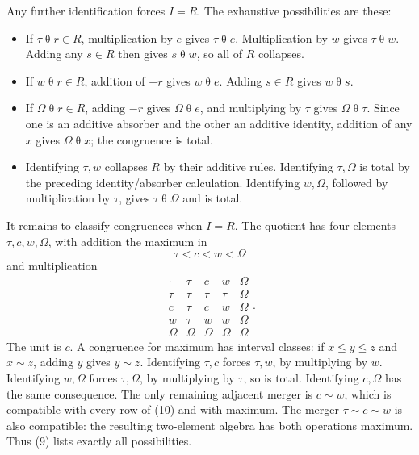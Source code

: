 \documentclass[
]{article}
\providecommand{\tightlist}{%
  \setlength{\itemsep}{0pt}\setlength{\parskip}{0pt}}
\begin{document}
Any further identification forces \(I=R\). The exhaustive possibilities
are these:

\begin{itemize}
\tightlist
\item
  If \(\tau\mathrel\theta r\in R\), multiplication by \(e\) gives
  \(\tau\mathrel\theta e\). Multiplication by \(w\) gives
  \(\tau\mathrel\theta w\). Adding any \(s\in R\) then gives
  \(s\mathrel\theta w\), so all of \(R\) collapses.
\item
  If \(w\mathrel\theta r\in R\), addition of \(-r\) gives
  \(w\mathrel\theta e\). Adding \(s\in R\) gives \(w\mathrel\theta s\).
\item
  If \(\Omega\mathrel\theta r\in R\), adding \(-r\) gives
  \(\Omega\mathrel\theta e\), and multiplying by \(\tau\) gives
  \(\Omega\mathrel\theta\tau\). Since one is an additive absorber and
  the other an additive identity, addition of any \(x\) gives
  \(\Omega\mathrel\theta x\); the congruence is total.
\item
  Identifying \(\tau,w\) collapses \(R\) by their additive rules.
  Identifying \(\tau,\Omega\) is total by the preceding
  identity/absorber calculation. Identifying \(w,\Omega\), followed by
  multiplication by \(\tau\), gives \(\tau\mathrel\theta\Omega\) and is
  total.
\end{itemize}

It remains to classify congruences when \(I=R\). The quotient has four
elements \(\tau,c,w,\Omega\), with addition the maximum in \[
\tau<c<w<\Omega
\] and multiplication \[
\begin{array}{c|cccc}
\cdot&\tau&c&w&\Omega\\\hline
\tau&\tau&\tau&\tau&\Omega\\
c&\tau&c&w&\Omega\\
w&\tau&w&w&\Omega\\
\Omega&\Omega&\Omega&\Omega&\Omega
\end{array}.
\tag{10}
\] The unit is \(c\). A congruence for maximum has interval classes: if
\(x\le y\le z\) and \(x\sim z\), adding \(y\) gives \(y\sim z\).
Identifying \(\tau,c\) forces \(\tau,w\), by multiplying by \(w\).
Identifying \(w,\Omega\) forces \(\tau,\Omega\), by multiplying by
\(\tau\), so is total. Identifying \(c,\Omega\) has the same
consequence. The only remaining adjacent merger is \(c\sim w\), which is
compatible with every row of (10) and with maximum. The merger
\(\tau\sim c\sim w\) is also compatible: the resulting two-element
algebra has both operations maximum. Thus (9) lists exactly all
possibilities.
\end{document}
